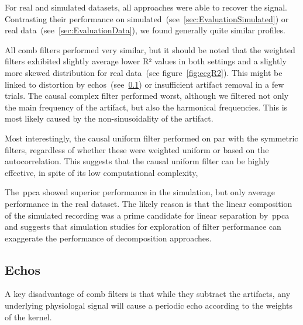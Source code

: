\documentclass[a4paper]{article}
\newcommand{\figref}[1]{(see figure~\ref{#1})}
\newcommand{\secref}[1]{(see~\ref{#1})}
\begin{document}
For real and simulated datasets, all approaches were able to recover the signal. Contrasting their performance on simulated~\secref{sec:EvaluationSimulated} or real data~\secref{sec:EvaluationData}, we found generally quite similar profiles.

All comb filters performed very similar, but it should be noted that the weighted filters exhibited slightly average lower R² values in both settings and a slightly more skewed distribution for real data~\figref{fig:ecgR2}. This might be linked to distortion by echos~\secref{sec:discussEcho} or insufficient artifact removal in a few trials.
The causal complex filter performed worst, although we filtered not only the main frequency of the artifact, but also the harmonical frequencies. This is most likely caused by the non-sinusoidality of the artifact.

Most interestingly, the causal uniform filter performed on par with the symmetric filters, regardless of whether these were weighted uniform or based on the autocorrelation. This suggests that the causal uniform filter can be highly effective, in spite of its low computational complexity,

The~\gls{ppca} showed superior performance in the simulation, but only average performance in the real dataset. The likely reason is that the linear composition of the simulated recording was a prime candidate for linear separation by~\gls{ppca} and suggests that simulation studies for exploration of filter performance can exaggerate the performance of decomposition approaches.

\subsection{Echos}\label{sec:discussEcho}
A key disadvantage of comb filters is that while they subtract the artifacts, any underlying physiologal signal will cause a periodic echo according to the weights of the kernel.
\end{document}
